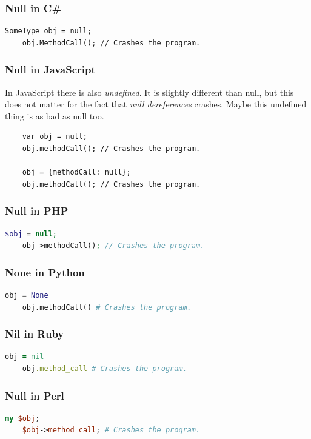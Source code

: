 \documentclass[11pt, a4paper]{report}
\begin{document}
\subsubsection{Null in C\#}
\begin{lstlisting}[language={[Sharp]C}]
    SomeType obj = null;
    obj.MethodCall(); // Crashes the program.
\end{lstlisting}

\subsubsection{Null in JavaScript}
In JavaScript there is also \textit{undefined}. It is slightly different than null, but this does not matter for the fact that \textit{null dereferences} crashes. Maybe this undefined thing is as bad as null too.

\begin{lstlisting}
    var obj = null;
    obj.methodCall(); // Crashes the program.

    obj = {methodCall: null};
    obj.methodCall(); // Crashes the program.
\end{lstlisting}

\subsubsection{Null in PHP}
\begin{lstlisting}[language=PHP]
    $obj = null;
    obj->methodCall(); // Crashes the program.
\end{lstlisting}

\subsubsection{None in Python}
\begin{lstlisting}[language=Python]
    obj = None
    obj.methodCall() # Crashes the program.
\end{lstlisting}

\subsubsection{Nil in Ruby}
\begin{lstlisting}[language=Ruby]
    obj = nil
    obj.method_call # Crashes the program.
\end{lstlisting}

\subsubsection{Null in Perl}
\begin{lstlisting}[language=Perl]
    my $obj;
    $obj->method_call; # Crashes the program.
\end{lstlisting}
\end{document}
